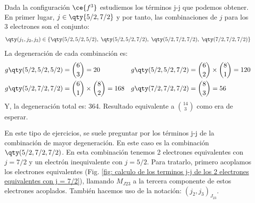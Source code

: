 Dada la configuración $\ce{f^{3}}$ estudiemos los términos j-j que podemos obtener. En primer lugar, $j \in \qty{5/2, 7/2}$ y por tanto, las combinaciones de $j$ para los 3 electrones son el conjunto: 
\begin{align*}
\qty(j_{1}, j_{2}, j_{3}) \in \left\{\qty(5/2, 5/2, 5/2),\;  \qty(5/2, 5/2, 7/2),\;  \qty(5/2, 7/2, 7/2),\;  \qty(7/2, 7/2, 7/2)\right\}
\end{align*}
La degeneración de cada combinación es: 
\begin{align*}
  g\qty(5/2, 5/2, 5/2) &= \binom{6}{3} = 20 &
g\qty(5/2, 5/2, 7/2) &= \binom{6}{2} \times  \binom{8}{1} = 120 \\
g\qty(5/2, 7/2, 7/2) &= \binom{6}{1} \times  \binom{8}{2} = 168 & 
g\qty(7/2, 7/2, 7/2) &= \binom{8}{3} = 56
\end{align*}
Y, la degeneración total es: 364. Resultado equivalente a $\binom{14}{3}$ como era de esperar. \par 
En este tipo de ejercicios, se suele preguntar por los términos j-j de la combinación de mayor degeneración. En este caso es la combinación $\qty(5/2, 7/2, 7/2)$. En esta combinación tenemos 2 electrones equivalentes con $j = 7/2$ y un electrón inequivalente con $j = 5/2$. Para tratarlo, primero acoplamos los electrones equivalentes (Fig. \ref{fig: calculo de los terminos j-j de los 2 electrones equivalentes con j = 7/2}), llamando $M_{J23}$ a la tercera componente de estos electrones acoplados.  También hacemos uso de la notación: $(j_{2},j_{3})_{J_{23}}$.
